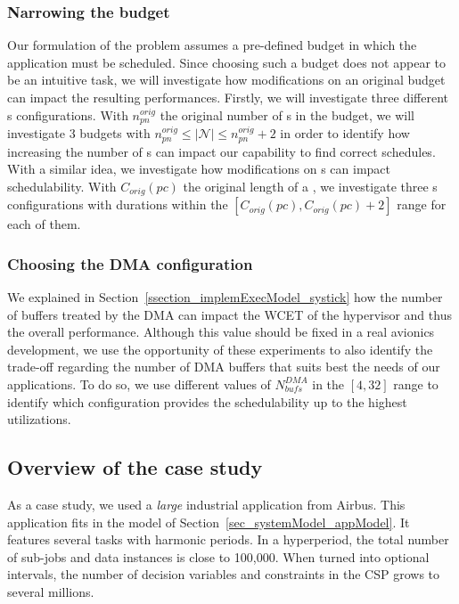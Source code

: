 \documentclass[main.tex]{subfiles}
\begin{document}
\subsubsection{Narrowing the budget}
\label{sssec_validation_expGoalNarrowBudget}
Our formulation of the problem assumes a pre-defined budget in which the application must be scheduled. Since choosing such a budget does not appear to be an intuitive task, we will investigate how modifications on an original budget can impact the resulting performances. Firstly, we will investigate three different \PN{}s configurations. With $n_{pn}^{orig}$ the original number of \PN{}s in the budget, we will investigate 3 budgets with $ n_{pn}^{orig} \leq |\mathcal{N}| \leq n_{pn}^{orig} + 2$ in order to identify how increasing the number of \PN{}s can impact our capability to find correct schedules. With a similar idea, we investigate how modifications on \PC{}s can impact schedulability. With $C_{orig}(pc)$ the original length of a \PC{}, we investigate three \PC{}s configurations with durations within the $[ C_{orig}(pc) , C_{orig}(pc) +2 ]$ range for each of them.

\subsubsection{Choosing the DMA configuration}
We explained in Section~\ref{ssection_implemExecModel_systick} how the number of buffers treated by the DMA can impact the WCET of the hypervisor and thus the overall performance. Although this value should be fixed in a real avionics development, we use the opportunity of these experiments to also identify the trade-off regarding the number of DMA buffers that suits best the needs of our applications. To do so, we use different values of $N_{bufs}^{DMA}$ in the $[4,32]$ range to identify which configuration provides the schedulability up to the highest utilizations.

\subsection{Overview of the case study}
As a case study, we used a \emph{large} industrial application from Airbus. This application fits in the model of Section~\ref{sec_systemModel_appModel}. It features several tasks with harmonic periods. In a hyperperiod, the total number of sub-jobs and data instances is close to 100,000. When turned into optional intervals, the number of decision variables and constraints in the CSP grows to several millions. 
\end{document}
